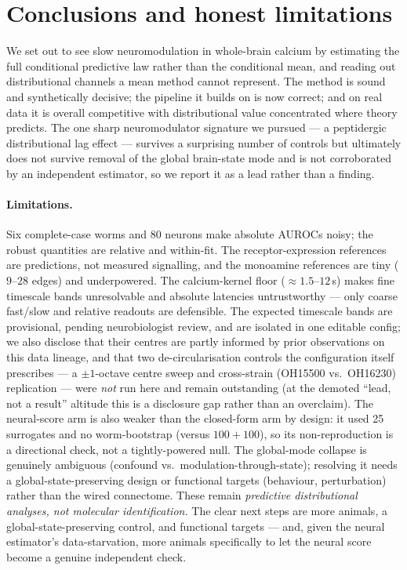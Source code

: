 \documentclass[11pt]{article}
\begin{document}
\section{Conclusions and honest limitations}
\label{sec:conclusions}

We set out to see slow neuromodulation in whole-brain calcium by estimating the full conditional
predictive law rather than the conditional mean, and reading out distributional channels a mean method
cannot represent. The method is sound and synthetically decisive; the pipeline it builds on is now
correct; and on real data it is overall competitive with distributional value concentrated where
theory predicts. The one sharp neuromodulator signature we pursued --- a peptidergic
distributional lag effect --- survives a surprising number of controls but ultimately does not
survive removal of the global brain-state mode and is not corroborated by an independent estimator, so
we report it as a lead rather than a finding.

\paragraph{Limitations.} Six complete-case worms and 80 neurons make absolute AUROCs noisy; the robust
quantities are relative and within-fit. The receptor-expression references are predictions, not
measured signalling, and the monoamine references are tiny ($9$--$28$ edges) and underpowered. The
calcium-kernel floor ($\approx1.5$--$12$\,s) makes fine timescale bands unresolvable and absolute
latencies untrustworthy --- only coarse fast/slow and relative readouts are defensible. The expected
timescale bands are provisional, pending neurobiologist review, and are isolated in one editable
config; we also disclose that their centres are partly informed by prior observations on this data
lineage, and that two de-circularisation controls the configuration itself prescribes --- a
$\pm1$-octave centre sweep and cross-strain (OH15500 vs.\ OH16230) replication --- were \emph{not}
run here and remain outstanding (at the demoted ``lead, not a result'' altitude this is a disclosure
gap rather than an overclaim). The neural-score arm is also weaker than the closed-form arm by
design: it used 25 surrogates and no worm-bootstrap (versus $100+100$), so its non-reproduction is a
directional check, not a tightly-powered null. The global-mode collapse is genuinely ambiguous
(confound vs.\ modulation-through-state);
resolving it needs a global-state-preserving design or functional targets (behaviour, perturbation)
rather than the wired connectome. These remain \emph{predictive distributional analyses, not molecular
identification.} The clear next steps are more animals, a global-state-preserving control, and
functional targets --- and, given the neural estimator's data-starvation, more animals specifically to
let the neural score become a genuine independent check.
\end{document}
